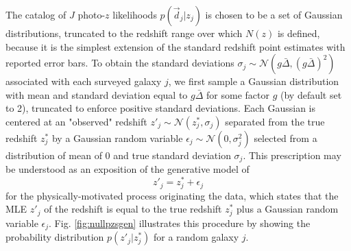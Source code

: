 \documentclass[preprint]{aastex}
\begin{document}
The catalog of $J$ photo-$z$ likelihoods $p(\vec{d}_{j}|z_{j})$ is chosen to be 
a set of Gaussian distributions, truncated to the redshift range over which 
$N(z)$ is defined, because it is the simplest extension of the standard 
redshift point estimates with reported error bars.  To obtain the standard 
deviations $\sigma_{j}\sim\mathcal{N}(g\bar{\Delta},(g\bar{\Delta})^{2})$ 
associated with each surveyed galaxy $j$, we first sample a Gaussian 
distribution with mean and standard deviation equal to $g\bar{\Delta}$ for some 
factor $g$ (by default set to 2), truncated to enforce positive standard 
deviations.  Each Gaussian is centered at an "observed" redshift 
$z'_{j}\sim\mathcal{N}(z^{*}_{j},\sigma_{j})$ separated from the true redshift 
$z^{*}_{j}$ by a Gaussian random variable 
$\epsilon_{j}\sim\mathcal{N}(0,\sigma^{2}_{j})$ selected from a distribution of 
mean of 0 and true standard deviation $\sigma_{j}$.   This prescription may be 
understood as an exposition of the generative model of 
\begin{equation}
\label{eq:genmod}
z'_{j} = z^{*}_{j}+\epsilon_{j}
\end{equation}
for the physically-motivated process originating the data, which states that 
the MLE $z'_{j}$ of the redshift is equal to the true redshift $z^{*}_{j}$ plus 
a Gaussian random variable $\epsilon_{j}$.  Fig. \ref{fig:nullpzsgen} 
illustrates this procedure by showing the probability distribution 
$p(z'_{j}|z^{*}_{j})$ for a random galaxy $j$.
\end{document}
